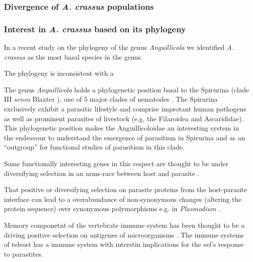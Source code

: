 \subsubsection{Divergence of \textit{A. crassus} populations}
\label{div-ac}


\subsubsection{Interest in \textit{A. crassus} based on its
    phylogeny}
\label{phyl-int}
  In a recent study on the phylogeny of the genus
  \textit{Anguillicola} we identified \textit{A. crassus} as the most
  basal species in the genus.

  The phylogeny is inconsistent with a

  The genus \textit{Anguillicola} holds a phylogenetic position basal
  to the Spirurina (clade III \textit{sensu} Blaxter
  \cite{blaxter_molecular_1998}), one of 5 major clades of nematodes
  \cite{nadler_molecular_2007, wijov_evolutionary_2006}. The Spirurina
  exclusively exhibit a parasitic lifestyle and comprise improtant
  human pathogens as well as prominent parasites of livestock
  (e.g. the Filaroidea and Ascarididae). This phylogenetic position
  makes the Anguillicoloidae an interesting system in the endeavour to
  understand the emergence of parasitism in Spirurina and as an
  ``outgroup'' for functional studies of parasitism in this
  clade. 


  Some functionally interesting genes in this respect are thought to
  be under diversifying selection in an arms-race between host and
  parasite \cite{zang_serine_2001}.

  That positive or diversifying selection on parasite proteins from
  the host-parasite interface can lead to a overabundance of
  non-synonymous changes (altering the protein sequence) over
  synonymous polymorphisms e.g. in \textit{Plasmodium}
  \cite{pmid7630387}.

  Memory componetnt of the vertebrate immune system has been thought
  to be a driving positive selection on antigenes of microorganisms
  \cite{conway_measuring_2002}. The immune systems of teleost has a
  immune system with interstin implications for the eel’s response to
  parastites.


